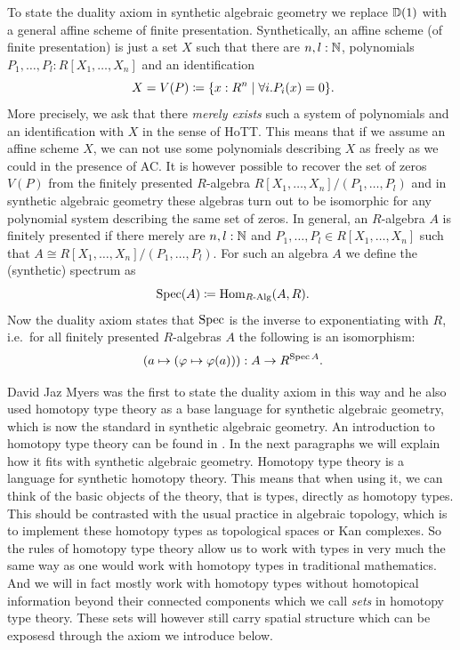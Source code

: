 To state the duality axiom in synthetic algebraic geometry we replace $\mathbb{D}(1)$ with a general affine scheme of finite presentation. Synthetically, an affine scheme (of finite presentation) is just a set \(X\) such that there are \(n,l:\mathbb{N}\), polynomials \(P_1,\dots,P_l:R[X_1,\dots,X_n]\) and an identification
\[
  X = V(P) \coloneq \{x:R^n\mid \forall i.P_i(x)=0\}\rlap{.}
\]
More precisely, we ask that there \emph{merely exists} such a system of polynomials and an identification with \(X\) in the sense of HoTT. This means that if we assume an affine scheme \(X\), we can not use some polynomials describing \(X\) as freely as we could in the presence of AC.
It is however possible to recover the set of zeros \(V(P)\) from the finitely presented \(R\)-algebra \(R[X_1,\dots,X_n]/(P_1,\dots,P_l)\) and in synthetic algebraic geometry these algebras turn out to be isomorphic for any polynomial system describing the same set of zeros.
In general, an \(R\)-algebra \(A\) is finitely presented if there merely are \(n,l:\mathbb{N}\) and \(P_1,\dots,P_l\in R[X_1,\dots,X_n]\) such that \(A\cong R[X_1,\dots,X_n]/(P_1,\dots,P_l)\). For such an algebra \(A\) we define the (synthetic) spectrum as
\[
\Spec(A)\coloneq \Hom_{\Alg{R}}(A,R)\rlap{.}
\]
Now the duality axiom states that $\operatorname{Spec}$ is the inverse to exponentiating with $R$, i.e.\ for all 
finitely presented $R$-algebras $A$ the following is an isomorphism:
\[
(a\mapsto (\varphi\mapsto \varphi(a))) : A\to R^{\Spec A}\rlap{.}
\]

David Jaz Myers was the first to state the duality axiom in this way and he also used homotopy type theory as a base language for synthetic algebraic geometry, which is now the standard in synthetic algebraic geometry. An introduction to homotopy type theory can be found in \cite{shulman-logic-of-spaces}.
In the next paragraphs we will explain how it fits with synthetic algebraic geometry. Homotopy type theory is a language for synthetic homotopy theory.
This means that when using it, we can think of the basic objects of the theory, that is types, directly as homotopy types. This should be contrasted with the usual practice in algebraic topology, which is to implement these homotopy types as topological spaces or Kan complexes.
So the rules of homotopy type theory allow us to work with types in very much the same way as one would work with homotopy types in traditional mathematics. And we will in fact mostly work with homotopy types without homotopical information beyond their connected components which we call \emph{sets} in homotopy type theory. These sets will however still carry spatial structure which can be exposesd through the axiom we introduce below.

